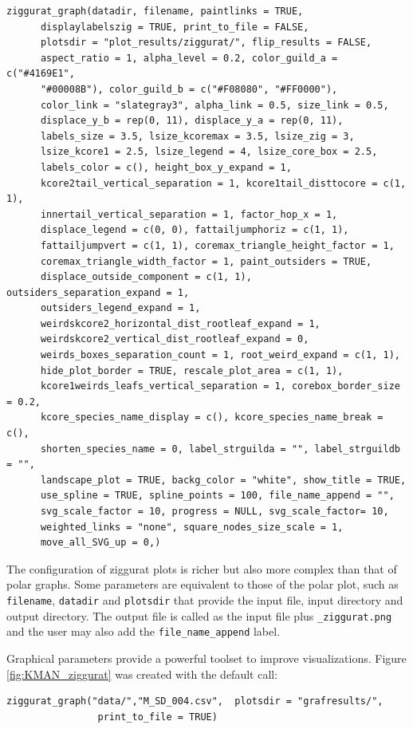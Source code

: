 \documentclass[11pt]{article}
\begin{document}
\fontsize{3.5mm}{3.5mm}\selectfont
\begin{verbatim}
ziggurat_graph(datadir, filename, paintlinks = TRUE,
	  displaylabelszig = TRUE, print_to_file = FALSE,
	  plotsdir = "plot_results/ziggurat/", flip_results = FALSE,
	  aspect_ratio = 1, alpha_level = 0.2, color_guild_a = c("#4169E1",
	  "#00008B"), color_guild_b = c("#F08080", "#FF0000"),
	  color_link = "slategray3", alpha_link = 0.5, size_link = 0.5,
	  displace_y_b = rep(0, 11), displace_y_a = rep(0, 11), 
	  labels_size = 3.5, lsize_kcoremax = 3.5, lsize_zig = 3, 
	  lsize_kcore1 = 2.5, lsize_legend = 4, lsize_core_box = 2.5, 
	  labels_color = c(), height_box_y_expand = 1, 
	  kcore2tail_vertical_separation = 1, kcore1tail_disttocore = c(1, 1), 
	  innertail_vertical_separation = 1, factor_hop_x = 1,
	  displace_legend = c(0, 0), fattailjumphoriz = c(1, 1),
	  fattailjumpvert = c(1, 1), coremax_triangle_height_factor = 1,
	  coremax_triangle_width_factor = 1, paint_outsiders = TRUE,
	  displace_outside_component = c(1, 1), outsiders_separation_expand = 1,
	  outsiders_legend_expand = 1,
	  weirdskcore2_horizontal_dist_rootleaf_expand = 1,
	  weirdskcore2_vertical_dist_rootleaf_expand = 0,
	  weirds_boxes_separation_count = 1, root_weird_expand = c(1, 1),
	  hide_plot_border = TRUE, rescale_plot_area = c(1, 1),
	  kcore1weirds_leafs_vertical_separation = 1, corebox_border_size = 0.2,
	  kcore_species_name_display = c(), kcore_species_name_break = c(),
	  shorten_species_name = 0, label_strguilda = "", label_strguildb = "",
	  landscape_plot = TRUE, backg_color = "white", show_title = TRUE,
	  use_spline = TRUE, spline_points = 100, file_name_append = "",
	  svg_scale_factor = 10, progress = NULL, svg_scale_factor= 10, 
	  weighted_links = "none", square_nodes_size_scale = 1, 
	  move_all_SVG_up = 0,)
\end{verbatim}
\normalsize

The configuration of ziggurat plots is richer but also more complex than that of polar graphs. Some parameters
are equivalent to those of the polar plot, such as \texttt{filename}, \texttt{datadir} and \texttt{plotsdir} that
provide the input file, input directory and output directory. The output file is called as the input file
plus \texttt{\_ziggurat.png} and the user may also add the \texttt{file\_name\_append} label.

Graphical parameters provide a powerful toolset to improve visualizations. Figure \ref{fig:KMAN_ziggurat} was created with the
default call:

\fontsize{3.5mm}{3.5mm}\selectfont
\begin{verbatim}
ziggurat_graph("data/","M_SD_004.csv",  plotsdir = "grafresults/", 
                print_to_file = TRUE)
\end{verbatim}
\normalsize
\end{document}
